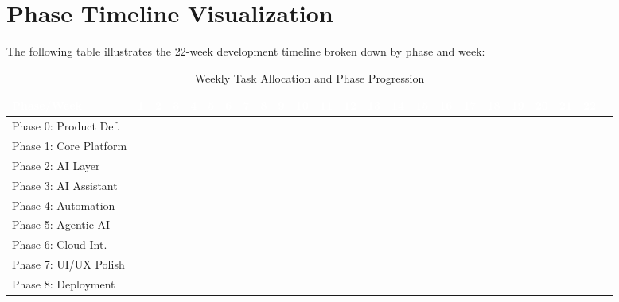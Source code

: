 \documentclass[12pt,oneside]{report}
\begin{document}
\section{Phase Timeline Visualization}

The following table illustrates the 22-week development timeline broken down by phase and week:

\vspace{0.5cm}

\begin{table}[h]
\centering
\caption{Weekly Task Allocation and Phase Progression}
\begin{tabular}{|l|ccccccccccccccccccccccc|}
\hline
\rowcolor{darkblue}
\textcolor{white}{\textbf{Phase/Week}} & \textcolor{white}{1} & \textcolor{white}{2} & \textcolor{white}{3} & \textcolor{white}{4} & \textcolor{white}{5} & \textcolor{white}{6} & \textcolor{white}{7} & \textcolor{white}{8} & \textcolor{white}{9} & \textcolor{white}{10} & \textcolor{white}{11} & \textcolor{white}{12} & \textcolor{white}{13} & \textcolor{white}{14} & \textcolor{white}{15} & \textcolor{white}{16} & \textcolor{white}{17} & \textcolor{white}{18} & \textcolor{white}{19} & \textcolor{white}{20} & \textcolor{white}{21} & \textcolor{white}{22} \\
\hline
\rowcolor{lightblue}
Phase 0: Product Def. & \cellcolor{darkblue} &  &  &  &  &  &  &  &  &  &  &  &  &  &  &  &  &  &  &  &  &  \\
\hline
\rowcolor{lightblue}
Phase 1: Core Platform & \cellcolor{darkblue} & \cellcolor{darkblue} & \cellcolor{darkblue} & \cellcolor{darkblue} &  &  &  &  &  &  &  &  &  &  &  &  &  &  &  &  &  &  \\
\hline
\rowcolor{lightblue}
Phase 2: AI Layer &  &  &  &  & \cellcolor{darkgreen} & \cellcolor{darkgreen} & \cellcolor{darkgreen} & \cellcolor{darkgreen} &  &  &  &  &  &  &  &  &  &  &  &  &  &  \\
\hline
\rowcolor{lightblue}
Phase 3: AI Assistant &  &  &  &  &  &  &  &  & \cellcolor{darkorange} & \cellcolor{darkorange} &  &  &  &  &  &  &  &  &  &  &  &  \\
\hline
\rowcolor{lightblue}
Phase 4: Automation &  &  &  &  &  &  &  &  &  &  & \cellcolor{darkorange} & \cellcolor{darkorange} &  &  &  &  &  &  &  &  &  &  \\
\hline
\rowcolor{lightblue}
Phase 5: Agentic AI &  &  &  &  &  &  &  &  &  &  &  &  & \cellcolor{darkgreen} & \cellcolor{darkgreen} & \cellcolor{darkgreen} & \cellcolor{darkgreen} &  &  &  &  &  &  \\
\hline
\rowcolor{lightblue}
Phase 6: Cloud Int. &  &  &  &  &  &  &  &  &  &  &  &  &  &  &  &  & \cellcolor{darkorange} & \cellcolor{darkorange} &  &  &  &  \\
\hline
\rowcolor{lightblue}
Phase 7: UI/UX Polish &  &  &  &  &  &  &  &  &  &  &  &  &  &  &  &  &  &  & \cellcolor{darkgreen} & \cellcolor{darkgreen} &  &  \\
\hline
\rowcolor{lightblue}
Phase 8: Deployment &  &  &  &  &  &  &  &  &  &  &  &  &  &  &  &  &  &  &  &  & \cellcolor{darkorange} & \cellcolor{darkorange} \\
\hline
\end{tabular}
\end{table}
\end{document}
